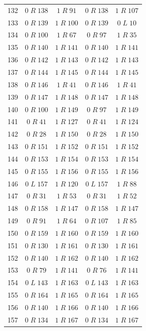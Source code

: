 \begin{longtable}{rcccc}
132 & $0\;R\;138$ & $1\;R\;91$ & $0\;R\;138$ & $1\;R\;107$\\
133 & $0\;R\;139$ & $1\;R\;100$ & $0\;R\;139$ & $0\;L\;10$\\
134 & $0\;R\;100$ & $1\;R\;67$ & $0\;R\;97$ & $1\;R\;35$\\
135 & $0\;R\;140$ & $1\;R\;141$ & $0\;R\;140$ & $1\;R\;141$\\
136 & $0\;R\;142$ & $1\;R\;143$ & $0\;R\;142$ & $1\;R\;143$\\
137 & $0\;R\;144$ & $1\;R\;145$ & $0\;R\;144$ & $1\;R\;145$\\
138 & $0\;R\;146$ & $1\;R\;41$ & $0\;R\;146$ & $1\;R\;41$\\
139 & $0\;R\;147$ & $1\;R\;148$ & $0\;R\;147$ & $1\;R\;148$\\
140 & $0\;R\;100$ & $1\;R\;149$ & $0\;R\;97$ & $1\;R\;149$\\
141 & $0\;R\;41$ & $1\;R\;127$ & $0\;R\;41$ & $1\;R\;124$\\
142 & $0\;R\;28$ & $1\;R\;150$ & $0\;R\;28$ & $1\;R\;150$\\
143 & $0\;R\;151$ & $1\;R\;152$ & $0\;R\;151$ & $1\;R\;152$\\
144 & $0\;R\;153$ & $1\;R\;154$ & $0\;R\;153$ & $1\;R\;154$\\
145 & $0\;R\;155$ & $1\;R\;156$ & $0\;R\;155$ & $1\;R\;156$\\
146 & $0\;L\;157$ & $1\;R\;120$ & $0\;L\;157$ & $1\;R\;88$\\
147 & $0\;R\;31$ & $1\;R\;53$ & $0\;R\;31$ & $1\;R\;52$\\
148 & $0\;R\;158$ & $1\;R\;147$ & $0\;R\;158$ & $1\;R\;147$\\
149 & $0\;R\;91$ & $1\;R\;64$ & $0\;R\;107$ & $1\;R\;85$\\
150 & $0\;R\;159$ & $1\;R\;160$ & $0\;R\;159$ & $1\;R\;160$\\
151 & $0\;R\;130$ & $1\;R\;161$ & $0\;R\;130$ & $1\;R\;161$\\
152 & $0\;R\;140$ & $1\;R\;162$ & $0\;R\;140$ & $1\;R\;162$\\
153 & $0\;R\;79$ & $1\;R\;141$ & $0\;R\;76$ & $1\;R\;141$\\
154 & $0\;L\;143$ & $1\;R\;163$ & $0\;L\;143$ & $1\;R\;163$\\
155 & $0\;R\;164$ & $1\;R\;165$ & $0\;R\;164$ & $1\;R\;165$\\
156 & $0\;R\;140$ & $1\;R\;166$ & $0\;R\;140$ & $1\;R\;166$\\
157 & $0\;R\;134$ & $1\;R\;167$ & $0\;R\;134$ & $1\;R\;167$\\

\end{longtable}
